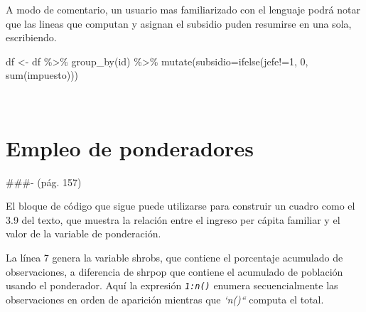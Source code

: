 \documentclass[
]{book}
\newenvironment{Shaded}{\begin{snugshade}}{\end{snugshade}}
\newcommand{\AttributeTok}[1]{\textcolor[rgb]{0.77,0.63,0.00}{#1}}
\newcommand{\DecValTok}[1]{\textcolor[rgb]{0.00,0.00,0.81}{#1}}
\newcommand{\FunctionTok}[1]{\textcolor[rgb]{0.00,0.00,0.00}{#1}}
\newcommand{\NormalTok}[1]{#1}
\newcommand{\OtherTok}[1]{\textcolor[rgb]{0.56,0.35,0.01}{#1}}
\newcommand{\SpecialCharTok}[1]{\textcolor[rgb]{0.00,0.00,0.00}{#1}}
\begin{document}
A modo de comentario, un usuario mas familiarizado con el lenguaje podrá notar que las lineas que computan y asignan el subsidio puden resumirse en una sola, escribiendo.

\begin{Shaded}
\begin{Highlighting}[]
\NormalTok{df }\OtherTok{\textless{}{-}}\NormalTok{ df }\SpecialCharTok{\%\textgreater{}\%} \FunctionTok{group\_by}\NormalTok{(id) }\SpecialCharTok{\%\textgreater{}\%} \FunctionTok{mutate}\NormalTok{(}\AttributeTok{subsidio=}\FunctionTok{ifelse}\NormalTok{(jefe}\SpecialCharTok{!=}\DecValTok{1}\NormalTok{, }\DecValTok{0}\NormalTok{, }\FunctionTok{sum}\NormalTok{(impuesto)))}
\end{Highlighting}
\end{Shaded}

~

\hypertarget{empleo-de-ponderadores}{%
\section{Empleo de ponderadores}\label{empleo-de-ponderadores}}

\#\#\#- (pág. 157)

El bloque de código que sigue puede utilizarse para construir un cuadro como el 3.9 del texto, que muestra la relación entre el ingreso per cápita familiar y el valor de la variable de ponderación.

La línea 7 genera la variable shrobs, que contiene el porcentaje acumulado de observaciones, a diferencia de shrpop que contiene el acumulado de población usando el ponderador. Aquí la expresión \emph{\texttt{1:n()}} enumera secuencialmente las observaciones en orden de aparición mientras que \emph{`n()``} computa el total.
\end{document}
